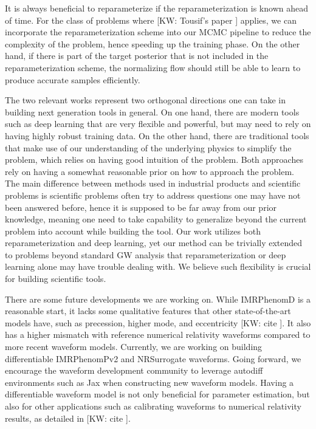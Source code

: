 \documentclass[twocolumn]{aastex631}
\newcommand{\kw}[1]{{\color{rb4}[KW: #1 ]}}
\begin{document}
It is always beneficial to reparameterize if the reparameterization is known
ahead of time. For the class of problems where \kw{Tousif's paper} applies, we
can incorporate the reparameterization scheme into our MCMC pipeline to reduce
the complexity of the problem, hence speeding up the training phase. On the
other hand, if there is part of the target posterior that is not included in the
reparameterization scheme, the normalizing flow should still be able to learn to
produce accurate samples efficiently.

The two relevant works represent two orthogonal directions one can take in
building next generation tools in general. On one hand, there are modern tools
such as deep learning that are very flexible and powerful, but may need to rely
on having highly robust training data. On the other hand, there are traditional
tools that make use of our understanding of the underlying physics to simplify
the problem, which relies on having good intuition of the problem. Both
approaches rely on having a somewhat reasonable prior on how to approach the
problem. The main difference between methods used in industrial products and
scientific problems is scientific problems often try to address questions one
may have not been answered before, hence it is supposed to be far away from our
prior knowledge, meaning one need to take capability to generalize beyond the
current problem into account while building the tool. Our work utilizes both
reparameterization and deep learning, yet our method can be trivially extended
to problems beyond standard GW analysis that reparameterization or deep learning
alone may have trouble dealing with. We believe such flexibility is crucial for
building scientific tools.

There are some future developments we are working on. While IMRPhenomD is
a reasonable start, it lacks some qualitative features that other
state-of-the-art models have, such as precession, higher mode, and eccentricity \kw{cite}. It
also has a higher mismatch with reference numerical relativity waveforms compared
to more recent waveform models. Currently, we are working on building differentiable
IMRPhenomPv2 and NRSurrogate waveforms. Going forward, we encourage the waveform
development community to leverage autodiff environments such as Jax when
constructing new waveform models. Having a differentiable waveform model is not
only beneficial for parameter estimation, but also for other applications such
as calibrating waveforms to numerical relativity results, as detailed in
\kw{cite}.
\end{document}
